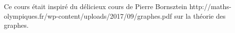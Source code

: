 Ce cours était inspiré du délicieux cours de Pierre Bornsztein http://maths-olympiques.fr/wp-content/uploads/2017/09/graphes.pdf sur la théorie des graphes.